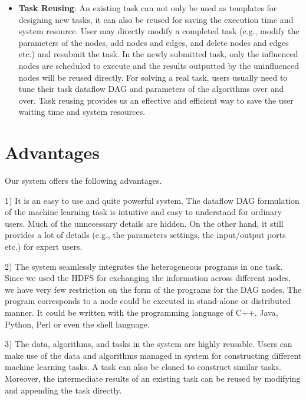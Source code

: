 \documentclass{sig-alternate-05-2015}
\begin{document}
\begin{itemize}
    \item \textbf{Task Reusing}: An existing task can not only be used as templates for designing new tasks, it can also be reused for saving the execution time and system resource. User may directly modify a completed task (e.g., modify the parameters of the nodes, add nodes and edges, and delete nodes and edges etc.) and resubmit the task. In the newly submitted task, only the influenced nodes are scheduled to execute and the results outputted by the uninfluenced nodes will be reused directly. For solving a real task, users usually need to tune their task dataflow DAG and parameters of the algorithms over and over. Task reusing provides us an effective and efficient way to save the user waiting time and system resources. 
\end{itemize}

\section{Advantages}
Our system offers the following advantages. 

1) It is an easy to use and quite powerful system. The dataflow DAG formulation of the machine learning task is intuitive and easy to understand for ordinary users. Much of the unnecessary details are hidden. On the other hand, it still provides a lot of details (e.g., the parameters settings, the input/output ports etc.) for expert users.

2) The system seamlessly integrates the heterogeneous programs in one task. Since we used the HDFS for exchanging the information across different nodes, we have very few restriction on the form of the programs for the DAG nodes. The program corresponds to a node could be executed in stand-alone or distributed manner. It could be written with the programming language of C++, Java, Python, Perl or even the shell language.

3) The data, algorithms, and tasks in the system are highly reusable. Users can make use of the data and algorithms managed in system for constructing different machine learning tasks. A task can also be cloned to construct similar tasks. Moreover, the intermediate results of an existing task can be reused by modifying and appending the task directly.
\end{document}
